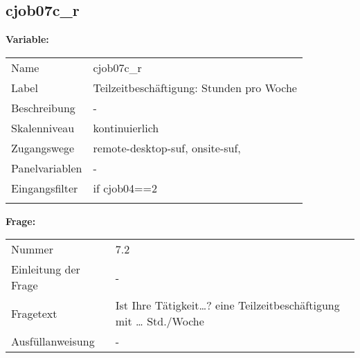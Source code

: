 	
	
	\subsection{cjob07c\_r}
	\label{subSection:cjob07c_r}

	\noindent\textbf{Variable:}\\
		\begin{tabular}{lL{11.3cm}}
			\label{tableVariable:cjob07c_r}
			Name & cjob07c\_r \\
			Label & Teilzeitbeschäftigung: Stunden pro Woche \\
			Beschreibung & - \\
			Skalenniveau & kontinuierlich \\
			Zugangswege &
				remote-desktop-suf,
				onsite-suf,
 \\
			Panelvariablen & -
			 \\
			Eingangsfilter & if cjob04==2 \\
 \\
		\end{tabular}

		\vspace*{1 cm}
		\noindent\textbf{Frage:}\\
		\begin{tabular}{lL{11.3cm}}
			\label{tableQuestion:cjob07c_r}
			Nummer & 7.2 \\
			Einleitung der Frage & - \\
			Fragetext & Ist Ihre Tätigkeit…?
eine Teilzeitbeschäftigung mit … Std./Woche \\
			Ausfüllanweisung & - \\
		\end{tabular}




